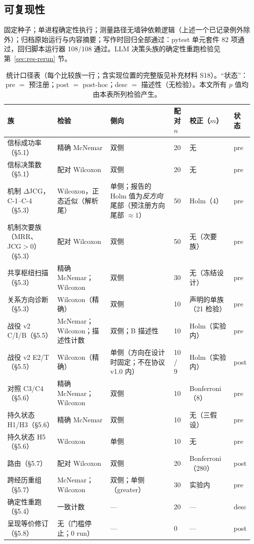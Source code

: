 \documentclass[10pt,a4paper]{ctexart}
\begin{document}
\subsection{可复现性}
固定种子；单进程确定性执行；测量路径无墙钟依赖逻辑（上述一个已记录例外除外）；归档原始运行与内容摘要；写作时回归全部通过：pytest 单元套件 82 项通过，回归脚本运行器 108/108 通过。LLM 决策头族的确定性重跑检验见第~\ref{sec:res-rerun} 节。

\begin{table}[t]
\centering\footnotesize
\caption{统计口径表（每个比较族一行；含实现位置的完整版见补充材料 S18）。“状态”：pre $=$ 预注册；post $=$ post-hoc；desc $=$ 描述性（无检验）。本文所有 $p$ 值均由本表所列检验产生。}
\label{tab:stats}
\begin{tabular}{L{2.9cm}L{3.3cm}L{2.3cm}L{1.1cm}L{2.2cm}L{1.0cm}}
\toprule
\textbf{族} & \textbf{检验} & \textbf{侧向} & \textbf{配对 $n$} & \textbf{校正（$m$）} & \textbf{状态} \\
\midrule
信标成功率（\S5.1） & 精确 McNemar & 双侧 & 20 & 无 & pre \\
信标决策数（\S5.1） & 配对 Wilcoxon & 双侧 & 20 & 无 & pre \\
机制 $\Delta$JCG，C-1--C-4（\S5.3） & Wilcoxon，正态近似（解析尾） & 单侧；报告的 Holm 值为\emph{反方向}尾部（预注册方向尾部 ${\approx}1$） & 50 & Holm（4） & pre \\
机制次要族（MRR、JCG${>}0$）（\S5.3） & 配对 Wilcoxon & 双侧 & 50 & 无（次要族） & pre \\
共享枢纽扫描（\S5.3） & 精确 McNemar；Wilcoxon & 双侧 & 30 & 无（冻结设计） & pre \\
关系方向诊断（\S5.3） & Wilcoxon（精确） & 双侧 & 10 & 声明的单族（21 检验） & pre \\
战役 v2 C/I/B（\S5.5） & McNemar；Wilcoxon；描述性计数 & 双侧；B 描述性 & 10 & Holm（实验内） & pre \\
战役 v2 E2/T（\S5.5） & Wilcoxon（精确） & 单侧（方向在设计时固定；不在协议 v1.0 内） & 10 / 9 & Holm（实验内） & post \\
对照 C3/C4（\S5.6） & 精确 McNemar；Wilcoxon & 双侧 & 10 & Bonferroni（8） & pre \\
持久状态 H1/H3（\S5.6） & 精确 McNemar & 双侧 & 10 & 无（三假设） & pre \\
持久状态 H5（\S5.6） & Wilcoxon & 单侧 & 10 & 无 & pre \\
路由（\S5.7） & 配对 Wilcoxon & 双侧 & 20 & Bonferroni（280） & post \\
跨经历重组（\S5.7） & McNemar；Wilcoxon & 双侧；单侧（greater） & 30 & 实验内 & pre \\
确定性重跑（\S5.4） & 一致计数 & --- & 20 & --- & desc \\
呈现等价修订（\S5.8） & 无（门槛停止；0 run） & --- & 0 & --- & post \\
\bottomrule
\end{tabular}
\end{table}
\end{document}
